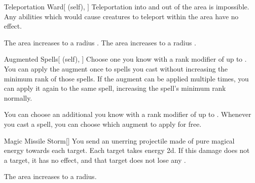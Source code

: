 \lowercase{\hypertarget{spell:Teleportation Ward}{}}\label{spell:Teleportation Ward}
\begin{attuneability}[Rank 4]{\hypertarget{spell:Teleportation Ward}{Teleportation Ward}}[ (self), ]
Teleportation into and out of the area is impossible.
Any abilities which would cause creatures to teleport within the area have no effect.

\rankline
{} The area increases to a \areahuge radius .
 The area increases to a \areaext radius .

\end{attuneability}
\vspace{0.25em}



\lowercase{\hypertarget{spell:Augmented Spells}{}}\label{spell:Augmented Spells}
\begin{attuneability}[Rank 5]{\hypertarget{spell:Augmented Spells}{Augmented Spells}}[ (self), ]
Choose one  you know with a rank modifier of up to .
You can apply the augment once to spells you cast without increasing the minimum rank of those spells.
If the augment can be applied multiple times, you can apply it again to the same spell, increasing the spell's minimum rank normally.

\rankline
{} You can choose an additional  you know with a rank modifier of up to .
Whenever you cast a spell, you can choose which augment to apply for free.

\end{attuneability}
\vspace{0.25em}



\lowercase{\hypertarget{spell:Magic Missile Storm}{}}\label{spell:Magic Missile Storm}
\begin{freeability}[Rank 5]{\hypertarget{spell:Magic Missile Storm}{Magic Missile Storm}}[]
You send an unerring projectile made of pure magical energy towards each target.
Each target takes energy  \minus2d.
If this damage does not  a target, it has no effect, and that target does not lose any .

\rankline
{} The area increases to a \areamed radius.

\end{freeability}
\vspace{0.25em}



